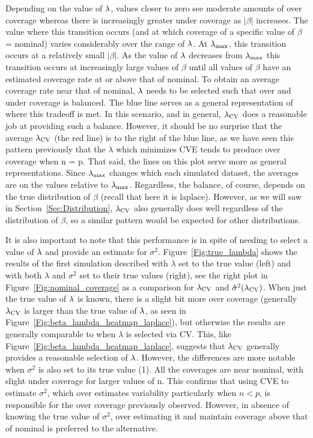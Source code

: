 Depending on the value of $\lambda$, values closer to zero see moderate amounts of over coverage whereas there is increasingly greater under coverage as $|\beta|$ increases. The value where this transition occurs (and at which coverage of a specific value of $\beta$ = nominal) varies considerably over the range of $\lambda$. At $\lambda_{\max}$, this transition occurs at a relatively small $|\beta|$. As the value of $\lambda$ decreases from $\lambda_{\max}$ this transition occurs at increasingly large values of $\beta$ until all values of $\beta$ have an estimated coverage rate at or above that of nominal. To obtain an average coverage rate near that of nominal, $\lambda$ needs to be selected such that over and under coverage is balanced. The blue line serves as a general representation of where this tradeoff is met. In this scenario, and in general, $\lambda_{\textrm{CV}}$ does a reasonable job at providing such a balance. However, it should be no surprise that the average $\lambda_{\textrm{CV}}$ (the red line) is to the right of the blue line, as we have seen this pattern previously that the $\lambda$ which minimizes CVE tends to produce over coverage when n = p. That said, the lines on this plot serve more as general representations. Since $\lambda_{\max}$ changes which each simulated dataset, the averages are on the values relative to $\lambda_{\max}$. Regardless, the balance, of course, depends on the true distribution of $\beta$ (recall that here it is laplace). However, as we will saw in Section~\ref{Sec:Distribution}, $\lambda_{\textrm{CV}}$ also generally does well regardless of the distribution of $\beta$, so a similar pattern would be expected for other distributions.

It is also important to note that this performance is in spite of needing to select a value of $\lambda$ and provide an estimate for $\sigma^2$. Figure~\ref{Fig:true_lambda} shows the results of the first simulation described with $\lambda$ set to the true value (left) and with both $\lambda$ and $\sigma^2$ set to their true values (right), see the right plot in Figure~\ref{Fig:nominal_coverage} as a comparison for $\lambda_{\textrm{CV}}$ and $\hat{\sigma}^2(\lambda_{\textrm{CV}})$. When just the true value of $\lambda$ is known, there is a slight bit more over coverage (generally $\lambda_{\textrm{CV}}$ is larger than the true value of $\lambda$, as seen in Figure~\ref{Fig:beta_lambda_heatmap_laplace}), but otherwise the results are generally comparable to when $\lambda$ is selected via CV. This, like Figure~\ref{Fig:beta_lambda_heatmap_laplace}, suggests that $\lambda_{\textrm{CV}}$ generally provides a reasonable selection of $\lambda$. However, the differences are more notable when $\sigma^2$ is also set to its true value (1). All the coverages are near nominal, with slight under coverage for larger values of n. This confirms that using CVE to estimate $\sigma^2$, which over estimates variability particularly when $n < p$, is responsible for the over coverage previously observed. However, in absence of knowing the true value of $\sigma^2$, over estimating it and maintain coverage above that of nominal is preferred to the alternative.

